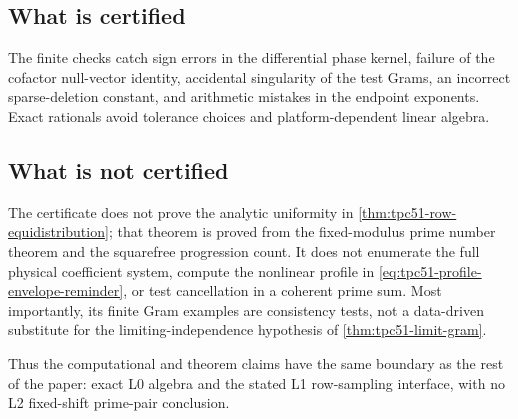 \subsection{What is certified}

The finite checks catch sign errors in the differential phase kernel,
failure of the cofactor null-vector identity, accidental singularity of
the test Grams, an incorrect sparse-deletion constant, and arithmetic
mistakes in the endpoint exponents.  Exact rationals avoid tolerance
choices and platform-dependent linear algebra.

\subsection{What is not certified}

The certificate does not prove the analytic uniformity in
\cref{thm:tpc51-row-equidistribution}; that theorem is proved from the
fixed-modulus prime number theorem and the squarefree progression
count.  It does not enumerate the full physical coefficient system,
compute the nonlinear profile in \eqref{eq:tpc51-profile-envelope-reminder},
or test cancellation in a coherent prime sum.  Most importantly, its
finite Gram examples are consistency tests, not a data-driven
substitute for the limiting-independence hypothesis of
\cref{thm:tpc51-limit-gram}.

Thus the computational and theorem claims have the same boundary as
the rest of the paper: exact L0 algebra and the stated L1 row-sampling
interface, with no L2 fixed-shift prime-pair conclusion.
